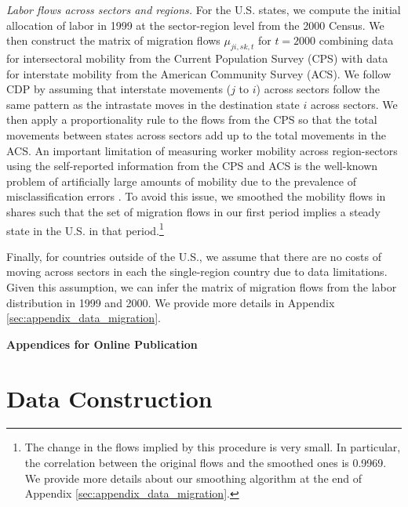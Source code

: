 \documentclass[12pt]{article}
\begin{document}
{\textit{Labor flows across sectors and regions.}} For the U.S. states, we compute the initial allocation of labor in 1999 at the sector-region level from the 2000 Census.  We then construct the matrix of migration flows $\mu_{ji,sk,t}$ for $t = 2000$ combining data for intersectoral mobility from the Current Population Survey (CPS) with data for interstate mobility from the American Community Survey (ACS). We follow CDP by assuming that interstate movements ($j$ to $i$) across sectors follow the same pattern as the intrastate moves in the destination state $i$ across sectors. We then apply a proportionality rule to the flows from the CPS so that the total movements between states across sectors add up to the total movements in the ACS. An important limitation of measuring worker mobility across region-sectors using the self-reported information from the CPS and ACS is the well-known problem of artificially large amounts of mobility due to the prevalence of misclassification errors \citep{murphy1987unemployment,kambourov2008rising,kambourov2013cautionary,Dvorkin2021}. To avoid this issue, we smoothed the mobility flows in shares such that the set of migration flows in our first period implies a steady state in the U.S. in that period.\footnote{The change in the flows implied by this procedure is very small. In particular, the correlation between the original flows and the smoothed ones is 0.9969. We provide more details about our smoothing algorithm at the end of Appendix \ref{sec:appendix_data_migration}.} 

Finally, for countries outside of the U.S., we assume that there are no costs of moving across sectors in each the single-region country due to data limitations. Given this assumption, we can infer the matrix of migration flows from the labor distribution in 1999 and 2000. We provide more details in Appendix \ref{sec:appendix_data_migration}.


\clearpage
\setcounter{page}{1}
\renewcommand{\theequation}{\Alph{section}\arabic{equation}}
\setcounter{equation}{0}
\noindent
{\LARGE \textbf{Appendices for Online Publication}}
\setlength{\belowdisplayskip}{3pt}
\setlength{\belowdisplayshortskip}{3pt}
\setlength{\abovedisplayskip}{3pt}
\setlength{\abovedisplayshortskip}{3pt}

\let\normalsize\small
\appendix
\small

\section{Data Construction} \label{sec:appendix_data}
\end{document}
